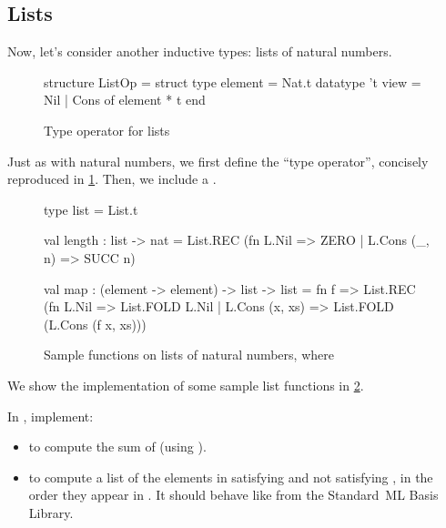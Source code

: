 \documentclass[11pt]{article}
\begin{document}
\subsection{Lists}\label{sec:lists}

Now, let's consider another inductive types: lists of natural numbers.

\begin{figure}[h]
  \begin{codeblock}
  structure ListOp =
    struct
      type element = Nat.t
      datatype 't view = Nil | Cons of element * t
    end
  \end{codeblock}
  \caption{Type operator for lists}
  \label{fig:list-op}
\end{figure}

Just as with natural numbers, we first define the ``type operator'', concisely reproduced in \cref{fig:list-op}.
Then, we include a .

\begin{figure}[h]
  \begin{codeblock}
  type list = List.t

  val length : list -> nat =
    List.REC
      (fn L.Nil => ZERO
        | L.Cons (_, n) => SUCC n)

  val map : (element -> element) -> list -> list =
    fn f =>
      List.REC
        (fn L.Nil          => List.FOLD L.Nil
          | L.Cons (x, xs) => List.FOLD (L.Cons (f x, xs)))
  \end{codeblock}
  \caption{Sample functions on lists of natural numbers, where }
  \label{fig:list-functions}
\end{figure}
We show the implementation of some sample list functions in \cref{fig:list-functions}.

\begin{task}{10}
  In , implement:
  \begin{itemize}
    \item {} to compute the sum of  (using ).
    \item {} to compute a list of the elements in  satisfying and not satisfying , in the order they appear in . It should behave like  from the Standard~ML Basis Library.
  \end{itemize}
\end{task}
\end{document}
